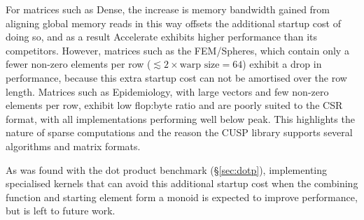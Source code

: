 %

For matrices such as Dense, the increase is memory bandwidth gained from
aligning global memory reads in this way offsets the additional startup cost of
doing so, and as a result Accelerate exhibits higher performance than its
competitors.
%
However, matrices such as the FEM/Spheres, which contain only a fewer non-zero
elements per row ($\lesssim 2 \times \text{warp size} = 64$) exhibit a drop in
performance, because this extra startup cost can not be amortised over the row
length.
%
Matrices such as Epidemiology, with large vectors and few non-zero elements per
row, exhibit low flop:byte ratio and are poorly suited to the CSR format, with
all implementations performing well below peak. This highlights the nature of
sparse computations and the reason the CUSP library supports several algorithms
and matrix formats.

As was found with the dot product benchmark (\S\ref{sec:dotp}), implementing
specialised kernels that can avoid this additional startup cost when the
combining function and starting element form a monoid is expected to improve
performance, but is left to future work.

%
%

